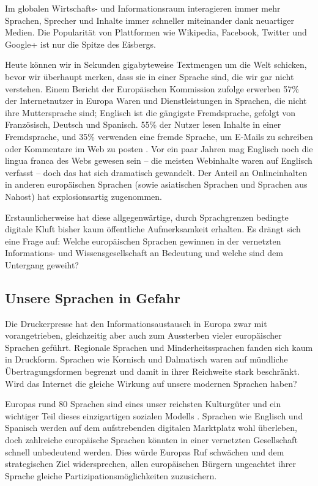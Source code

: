 \documentclass[]{../../metanetpaper}
\begin{document}
\begin{multicols}{2}
Im globalen Wirtschafts- und Informationsraum interagieren immer mehr Sprachen, Sprecher und Inhalte immer schneller miteinander dank neuartiger Medien. Die Popularität von Plattformen wie Wikipedia, Facebook, Twitter und Google+ ist nur die Spitze des Eisbergs.

Heute können wir in Sekunden gigabyteweise Textmengen um die Welt schicken, bevor wir überhaupt merken, dass sie in einer Sprache sind, die wir gar nicht verstehen. Einem Bericht der Europäischen Kommission zufolge erwerben 57\% der Internetnutzer in Europa Waren und Dienstleistungen in Sprachen, die nicht ihre Muttersprache sind; Englisch ist die gängigste Fremdsprache, gefolgt von Französisch, Deutsch und Spanisch. 55\% der Nutzer lesen Inhalte in einer Fremdsprache, und 35\% verwenden eine fremde Sprache, um E-Mails zu schreiben oder Kommentare im Web zu posten \cite{EC1}. Vor ein paar Jahren mag Englisch noch die lingua franca des Webs gewesen sein -- die meisten Webinhalte waren auf Englisch verfasst -- doch das hat sich dramatisch gewandelt. Der Anteil an Onlineinhalten in anderen europäischen Sprachen (sowie asiatischen Sprachen und Sprachen aus Nahost) hat explosionsartig zugenommen. 

Erstaunlicherweise hat diese allgegenwärtige, durch Sprachgrenzen bedingte digitale Kluft bisher kaum öffentliche Aufmerksamkeit erhalten. Es drängt sich eine Frage auf: Welche europäischen Sprachen gewinnen in der vernetzten Informations- und Wissensgesellschaft an Bedeutung und welche sind dem Untergang geweiht?

\subsection{Unsere Sprachen in Gefahr}

Die Druckerpresse hat den Informationsaustausch in Europa zwar mit vorangetrieben, gleichzeitig aber auch zum Aussterben vieler europäischer Sprachen geführt. Regionale Sprachen und Minderheitssprachen fanden sich kaum in Druckform. Sprachen wie Kornisch und Dalmatisch waren auf mündliche Übertragungsformen begrenzt und damit in ihrer Reichweite stark beschränkt. Wird das Internet die gleiche Wirkung auf unsere modernen Sprachen haben?


Europas rund 80 Sprachen sind eines unser reichsten Kulturgüter und ein wichtiger Teil dieses einzigartigen sozialen Modells \cite{EC2}. Sprachen wie Englisch und Spanisch werden auf dem aufstrebenden digitalen Marktplatz wohl überleben, doch zahlreiche europäische Sprachen könnten in einer vernetzten Gesellschaft schnell unbedeutend werden. Dies würde Europas Ruf schwächen und dem strategischen Ziel widersprechen, allen europäischen Bürgern ungeachtet ihrer Sprache gleiche Partizipationsmöglichkeiten zuzusichern.


\end{multicols}
\end{document}
